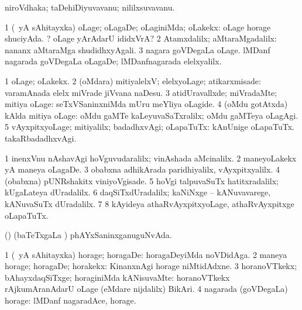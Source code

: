 {{{{{{\bentry 
{} 
\gl{\nA}
\expl{}
\bmng
niroVdhaka; taDehiDiyuvavanu; nililxsuvavanu. 
\emng
\eentry

\bentry
{} 
\gl{\kirxvi}
\expl{}
\bmng
\bnum
\num{1} (\pArxparx\ yA sAhitayxka) oLage; oLagaDe; oLaginiMda; oLakekx:  oLage horage shuciyAda. ? oLage yArAdarU ididxVrA? 
\num{2} Atamxdalilx; aMtaraMgadalilx:  nananx aMtaraMga shudidhxyAgali. 
\num{3} nagara goVDegaLa oLage.  lMDanf nagarada goVDegaLa oLagaDe; lMDanfnagarada elelxyalilx. 
\enum
\emng
\eentry

\bentry
{} 
\gl{\upa}
\expl{}
\bmng
\bnum
\num{1} oLage; oLakekx. 
\num{2} (oMdara) mitiyalelxV; elelxyoLage; atikarxmisade:  varamAnada elelx miVrade jiVvana naDesu. 
\num{3} atidUravallxde; miVradaMte; mitiya oLage:  seTxVSaninxniMda mUru meYliya oLagide. 
\num{4} (oMdu gotAtxda) kAlda mitiya oLage:  oMdu gaMTe kaLeyuvaSaTxralilx; oMdu gaMTeya oLagAgi. 
\num{5} vAyxpitxyoLage; mitiyalilx; badadhxvAgi; oLapaTuTx:  kAnUnige oLapaTuTx.  takaRbadadhxvAgi. 
\enum
\emng

\noindent
\gl{\pagu}
\expl{}
\bmng
\bnum
\num{1}  inenxVnu nAshavAgi hoVguvudaralilx; vinAshada aMcinalilx. 
\num{2}  maneyoLakekx yA maneya oLagaDe. 
\num{3} obabxna adhikArada paridhiyalilx, vAyxpitxyalilx. 
\num{4}  (obabxna) pUNRshakitx viniyoVgisade. 
\num{5}  hoVgi talpuvaSuTx hatitxradalilx; kUgaLateya dUradalilx. 
\num{6}  daqSiTxdUradalilx; kaNiNxge -- kANuvavarege, kANuvaSuTx dUradalilx. 
\num{7}  
\num{8}  kAyideya athaRvAyxpitxyoLage, athaRvAyxpitxge oLapaTuTx. 
\enum
\emng
\eentry

\bentry
{} 
\gl{\gu}
\expl{}
\bmng
(\AmA) (baTeTxgaLa \vi) phAYxSaninxganuguNvAda. 
\emng
\eentry

\bentry
{} 
\gl{\kirxvi}
\expl{}
\bmng
\bnum
\num{1} (\pArxparx\ yA sAhitayxka) horage; horagaDe:  horagaDeyiMda noVDidAga. 
\num{2} maneya horage; horagaDe; horakekx:  KinanxnAgi horage niMtidAdxne. 
\num{3} horanoVTkekx; bAhayxdaqSiTxge; horaginiMda kANisuvaMte:  horanoVTkekx rAjkumAranAdarU oLage (eMdare nijdalilx) BikAri. 
\num{4} nagarada (goVDegaLa) horage:  lMDanf nagaradAce, horage. 
\enum
\emng

}}}}}}

